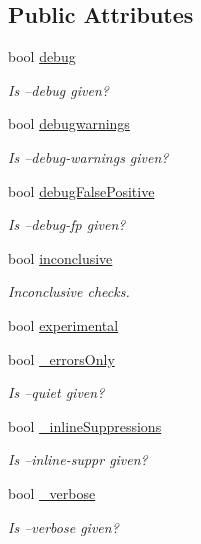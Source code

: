 \subsection*{Public Attributes}
\begin{DoxyCompactItemize}
\item 
bool \hyperlink{class_settings_ad9ae775f5f68995dd70b263ff006d5dd}{debug}
\begin{DoxyCompactList}\small\item\em Is --debug given? \end{DoxyCompactList}\item 
bool \hyperlink{class_settings_aff86aa98beb34d00d4b46b5fa0768cdc}{debugwarnings}
\begin{DoxyCompactList}\small\item\em Is --debug-\/warnings given? \end{DoxyCompactList}\item 
bool \hyperlink{class_settings_acca1011cb5bc234467cd3173da3e5f7e}{debug\-False\-Positive}
\begin{DoxyCompactList}\small\item\em Is --debug-\/fp given? \end{DoxyCompactList}\item 
bool \hyperlink{class_settings_a56c6e511f3a996d891bd2b9417d6670e}{inconclusive}
\begin{DoxyCompactList}\small\item\em Inconclusive checks. \end{DoxyCompactList}\item 
bool \hyperlink{class_settings_a66bd09ed65174792fef48d5948abfc40}{experimental}
\item 
bool \hyperlink{class_settings_acb01e09ba151cc22b13d44de6563a4e5}{\-\_\-errors\-Only}
\begin{DoxyCompactList}\small\item\em Is --quiet given? \end{DoxyCompactList}\item 
bool \hyperlink{class_settings_ad51ddd067998b229c64589f183952392}{\-\_\-inline\-Suppressions}
\begin{DoxyCompactList}\small\item\em Is --inline-\/suppr given? \end{DoxyCompactList}\item 
bool \hyperlink{class_settings_a4cbeac0f69cfe67ea995b2e8b03543fe}{\-\_\-verbose}
\begin{DoxyCompactList}\small\item\em Is --verbose given? \end{DoxyCompactList}\item 

\end{DoxyCompactItemize}
